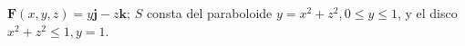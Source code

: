 \item $\mathbf{F}(x,y,z) = y\mathbf{j} - z\mathbf{k}$; $S$ consta del paraboloide $y = x^2 + z^2, 0 \le y \le 1$, y el disco $x^2 + z^2 \le 1, y = 1$.
